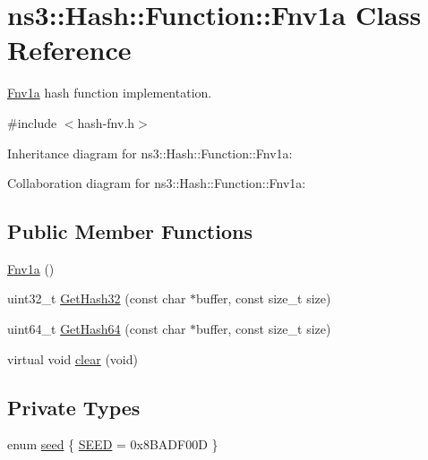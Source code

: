 \hypertarget{classns3_1_1Hash_1_1Function_1_1Fnv1a}{}\section{ns3\+:\+:Hash\+:\+:Function\+:\+:Fnv1a Class Reference}
\label{classns3_1_1Hash_1_1Function_1_1Fnv1a}


\hyperlink{classns3_1_1Hash_1_1Function_1_1Fnv1a}{Fnv1a} hash function implementation.  




{\ttfamily \#include $<$hash-\/fnv.\+h$>$}



Inheritance diagram for ns3\+:\+:Hash\+:\+:Function\+:\+:Fnv1a\+:


Collaboration diagram for ns3\+:\+:Hash\+:\+:Function\+:\+:Fnv1a\+:
\subsection*{Public Member Functions}
\begin{DoxyCompactItemize}
\item 
\hyperlink{classns3_1_1Hash_1_1Function_1_1Fnv1a_afa5b16d11218b88c6739d95492a84dae}{Fnv1a} ()
\item 
uint32\+\_\+t \hyperlink{classns3_1_1Hash_1_1Function_1_1Fnv1a_afa2474c3631440097d679da74256e529}{Get\+Hash32} (const char $\ast$buffer, const size\+\_\+t size)
\item 
uint64\+\_\+t \hyperlink{classns3_1_1Hash_1_1Function_1_1Fnv1a_a0738bb4a07a147d393ab21ffc1ebf730}{Get\+Hash64} (const char $\ast$buffer, const size\+\_\+t size)
\item 
virtual void \hyperlink{classns3_1_1Hash_1_1Function_1_1Fnv1a_abee36c21bdb634baec6ce3c1f4ab1d33}{clear} (void)
\end{DoxyCompactItemize}
\subsection*{Private Types}
\begin{DoxyCompactItemize}
\item 
enum \hyperlink{classns3_1_1Hash_1_1Function_1_1Fnv1a_a790d183d33edd4eecaecd1ecc9da0409}{seed} \{ \hyperlink{classns3_1_1Hash_1_1Function_1_1Fnv1a_a790d183d33edd4eecaecd1ecc9da0409a276170ac421707afe76330625d597761}{S\+E\+ED} = 0x8\+B\+A\+D\+F00D
 \}
\end{DoxyCompactItemize}
